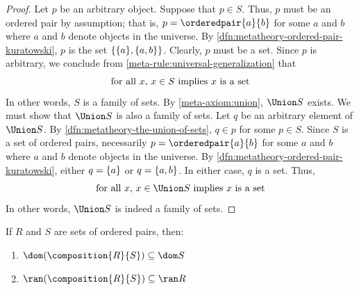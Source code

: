 \begin{proof}
    Let \( p \) be an arbitrary object. Suppose that \( p \in S \).
    Thus, \( p \) must be an ordered pair by assumption; that is, \( p = \orderedpair{a}{b} \)
    for some \( a \) and \( b \) where \( a \) and \( b \) denote objects in the universe.
    By \cref{dfn:metatheory-ordered-pair-kuratowski}, \( p \) is the set \(  \mleft\{ \mleft\{ a \mright\}, \mleft\{ a, b \mright\} \mright\} \).
    Clearly, \( p \) must be a set.
    Since \( p \) is arbitrary, we conclude from \cref{meta-rule:universal-generalization} that
    \begin{equation*}
        \text{for all \( x \), \( x \in S \) implies \( x \) is a set}
    \end{equation*}
    In other words, \( S \) is a family of sets.
    By \cref{meta-axiom:union}, \( \Union S \) exists.
    We must show that \( \Union S \) is also a family of sets.
    Let \( q \) be an arbitrary element of \( \Union S \).
    By \cref{dfn:metatheory-the-union-of-sets}, \( q \in p \) for some \( p \in S \).
    Since \( S \) is a set of ordered pairs, necessarily \( p = \orderedpair{a}{b} \) for some \( a \) and \( b \) where \( a \) and \( b \)
    denote objects in the universe.
    By \cref{dfn:metatheory-ordered-pair-kuratowski}, either \( q = \mleft\{ a \mright\} \) or \( q = \mleft\{ a, b \mright\} \).
    In either case, \( q \) is a set. Thus,
    \begin{equation*}
        \text{for all \( x \), \( x \in \Union S \) implies \( x \) is a set}
    \end{equation*}
    In other words, \( \Union S \) is indeed a family of sets.
\end{proof}

\begin{thm}
     \label{thm:metatheory-domain-and-range-of-the-composition-of-two-sets-of-ordered-pairs-is-subset-of-the-domain-and-range-of-one-of-its-components}
    If \( R \) and \( S \) are sets of ordered pairs, then:
    \begin{enumerate}[topsep=2pt,label=\textup{\texttt{(\alph*)}}]
        \item \( \dom \mleft( \composition{R}{S} \mright) \subseteq \dom S \)
        \item \( \ran \mleft( \composition{R}{S} \mright) \subseteq \ran R \)
    \end{enumerate}
\end{thm}

